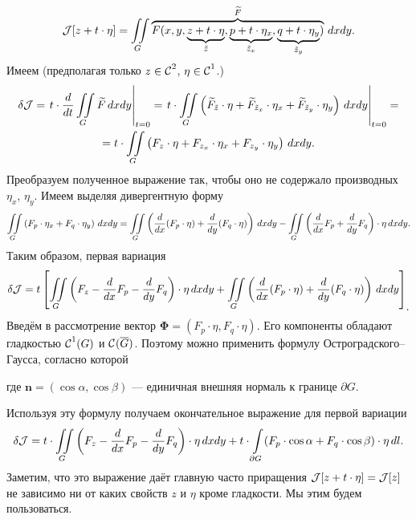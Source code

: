 \begin{equation*}
	\hfill\J[z+t\cdot\eta]=\iint\limits_{G}\overbrace{F(x,y,\underbrace{z+t\cdot\eta}_{\tilde{z}},\underbrace{p+t\cdot\eta_x}_{\tilde{z}_x},\underbrace{q+t\cdot\eta_y}_{\tilde{z}_y})}^{\widetilde{F}}\,dxdy.\hfill
\end{equation*}
Имеем (предполагая только $z\in\mathcal{C}{\mathstrut}^{2}_{}$, $\eta\in\mathcal{C}{\mathstrut}^{1}_{}$.)
\begin{multline*}
	\delta\mathcal{J}=\left.t\cdot\frac{d}{dt}\iint\limits_{G}\widetilde{F}\,dxdy\right|_{t=0}=\left.t\cdot\iint\limits_{G}\left(\widetilde{F}_{\tilde{z}}\cdot\eta+\widetilde{F}_{\tilde{z}_x}\cdot\eta_x+\widetilde{F}_{\tilde{z}_y}\cdot\eta_y\right)\,dxdy\right|_{t=0}=\\=t\cdot\iint\limits_{G}\left({F}_{z}\cdot\eta+{F}_{z_x}\cdot\eta_x+{F}_{z_y}\cdot\eta_y\right)\,dxdy.
\end{multline*}
Преобразуем полученное выражение так, чтобы оно не содержало производных $\eta_x$, $\eta_y$. Имеем выделяя дивергентную форму 
\begin{equation*}
	\iint\limits_{G}\left(F_p\cdot\eta_x+F_q\cdot\eta_y\right)\,dxdy=\iint\limits_{G}\left(\frac{d}{dx}(F_p\cdot\eta)+\frac{d}{dy}(F_q\cdot\eta)\right)\,dxdy-\iint\limits_{G}\left(\frac{d}{dx}F_p+\frac{d}{dy}F_q\right)\cdot\eta\,dxdy.
\end{equation*}
Таким образом, первая вариация
\begin{equation*}
	\hfill\delta\J=t\left[\iint\limits_{G}\left(F_z-\der{}{x}F_p-\der{}{y}F_q\right)\cdot\eta\,dxdy+\iint\limits_{G}\left(\der{}{x}(F_p\cdot\eta)+\der{}{y}(F_q\cdot\eta)\right)\,dxdy\right]_{\displaystyle.}\hfill
\end{equation*}
Введём в рассмотрение вектор $\bm{\Phi}=(F_p\cdot\eta,F_q\cdot\eta)$. Его компоненты обладают гладкостью $\mathcal{C}{\mathstrut}^{1}_{}(G)$ и $\mathcal{C}{\mathstrut}^{}_{}(\overline{G})$. Поэтому можно применить формулу Остроградского--Гаусса, согласно которой
\begin{center}
\end{center}
где $\bm{n}=(\cos\alpha,\cos\beta)$ --- единичная внешняя нормаль к границе $\partial G$.

\noindent Используя эту формулу получаем окончательное выражение для первой вариации
\begin{equation}\label{l9:eq:10}
	\hfill\delta\J=t\cdot\iint\limits_{G}\left(F_z-\der{}{x}F_p-\der{}{y}F_q\right)\cdot\eta\,dxdy+t\cdot\int\limits_{\partial G}(F_p\cdot\cos\alpha+F_q\cdot\cos\beta)\cdot\eta\,dl.\hfill
\end{equation}
Заметим, что это выражение даёт главную часто приращения $\mathcal{J}[z+t\cdot\eta]=\mathcal{J}[z]$ не зависимо ни от каких свойств $z$ и $\eta$ кроме гладкости. Мы этим будем пользоваться.

